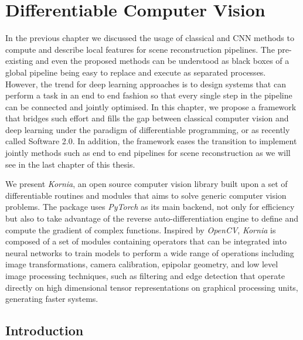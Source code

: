\chapter{Differentiable Computer Vision}
\label{chap:chap_03}

\newcommand{\lib}{\textit{Kornia}}

In the previous chapter we discussed the usage of classical and CNN methods to compute and describe local features for scene reconstruction pipelines. The pre-existing and even the proposed methods can be understood as black boxes of a global pipeline being easy to replace and execute as separated processes. However, the trend for deep learning approaches is to design systems that can perform a task in an end to end fashion so that every single step in the pipeline can be connected and jointly optimised. In this chapter, we propose a framework that bridges such effort and fills the gap between classical computer vision and deep learning under the paradigm of differentiable programming, or as recently called Software 2.0. In addition, the framework eases the transition to implement jointly methods such as end to end pipelines for scene reconstruction as we will see in the last chapter of this thesis.

We present \lib{}, an open source computer vision library built upon a set of differentiable routines and modules that aims to solve generic computer vision problems. The package uses \textit{PyTorch} as its main backend, not only for efficiency but also to take advantage of the reverse auto-differentiation engine to define and compute the gradient of complex functions. Inspired by \textit{OpenCV}, \lib{} is composed of a set of modules containing operators that can be integrated into neural networks to train models to perform a wide range of operations including image transformations, camera calibration, epipolar geometry, and low level image processing techniques, such as filtering and edge detection that operate directly on high dimensional tensor representations on graphical processing units, generating faster systems.

\section{Introduction}

